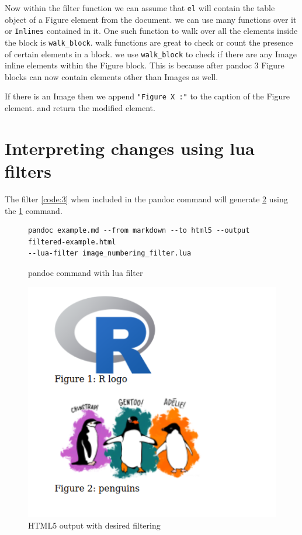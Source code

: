 Now within the filter function we can assume that \verb|el| will contain the table object of a Figure element from the document. we can use many functions over it or \verb|Inlines| contained in it. One such function to walk over all the elements inside the block is \verb|walk_block|. walk functions are great to check or count the presence of certain elements in a block. we use \verb|walk_block| to check if there are any Image inline elements within the Figure block. This is because after pandoc 3 \citep{pandoc} Figure blocks can now contain elements other than Images as well.

If there is an Image then we append \verb|"Figure X :"| to the caption of the Figure element.
and return the modified element.

\section{Interpreting changes using lua filters}

The filter \ref{code:3} when included in the pandoc command will generate \ref{fig:2} 
using the \ref{code:4} command.

\begin{figure}[htbp]
\begin{verbatim}
pandoc example.md --from markdown --to html5 --output filtered-example.html
--lua-filter image_numbering_filter.lua
\end{verbatim}
\caption{pandoc command with lua filter}
\label{code:4}
\end{figure}

\begin{figure}[htbp]
\centering
\includegraphics[width=0.5\linewidth]{figures/example-filtered.png}
\caption{HTML5 output with desired filtering}
\label{fig:2}
\end{figure}

